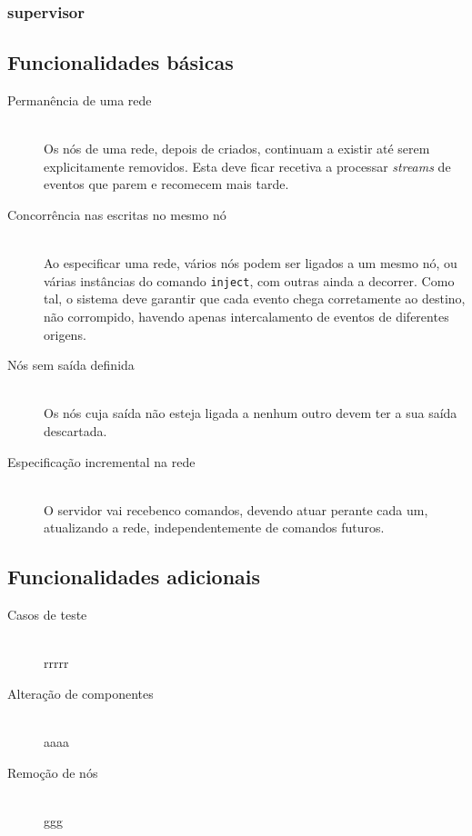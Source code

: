 \documentclass[12pt]{article}
\begin{document}
\subsubsection{supervisor}


\subsection{Funcionalidades básicas}
\begin{description} 

\item[Permanência de uma rede] \hfill \\
Os nós de uma rede, depois de criados, continuam a existir até serem explicitamente removidos. Esta deve ficar recetiva a processar \textit{streams} de eventos que parem e recomecem mais tarde.

\item[Concorrência nas escritas no mesmo nó] \hfill \\
Ao especificar uma rede, vários nós podem ser ligados a um mesmo nó, ou várias instâncias do comando \texttt{inject}, com outras ainda a decorrer. Como tal, o sistema deve garantir que cada evento chega corretamente ao destino, não corrompido, havendo apenas intercalamento de eventos de diferentes origens.

\item[Nós sem saída definida] \hfill \\
Os nós cuja saída não esteja ligada a nenhum outro devem ter a sua saída descartada.

\item[Especificação incremental na rede] \hfill \\
O servidor vai recebenco comandos, devendo atuar perante cada um, atualizando a rede, independentemente de comandos futuros.

\end{description}

\subsection{Funcionalidades adicionais}

\begin{description} 
\item[Casos de teste] \hfill \\
rrrrr

\item[Alteração de componentes] \hfill \\
aaaa

\item[Remoção de nós] \hfill \\
ggg


\end{description}
\end{document}
